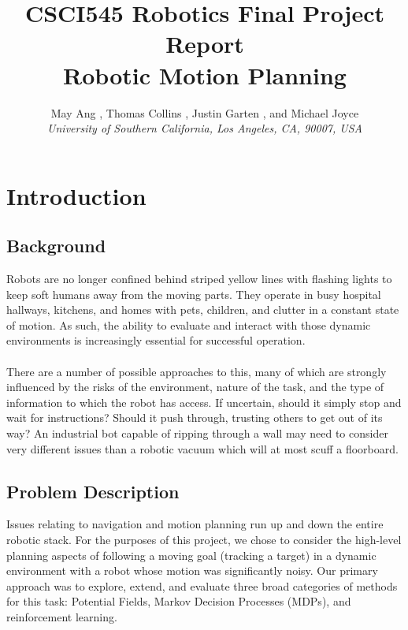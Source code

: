 \documentclass{aiaa-tc}%
\begin{document}
\title{CSCI545 Robotics Final Project Report\\
	Robotic Motion Planning}

 \author
{		May Ang%
		\hspace{3pt},
		Thomas Collins%
		\hspace{3pt},
		Justin Garten%
		\hspace{3pt},
		and Michael Joyce%
		\\
		\normalsize\itshape
		University of Southern California, Los Angeles, CA, 90007, USA\\
}
\maketitle

\section{Introduction}
\label{Introduction}

\subsection{Background}

Robots are no longer confined behind striped yellow lines
with flashing lights to keep soft humans away from the moving
parts. They operate in busy hospital hallways, kitchens, and homes
with pets, children, and clutter in a constant state of motion. As
such, the ability to evaluate and interact with those dynamic environments is
increasingly essential for successful operation. \\ \\
There are a number of possible approaches to this, many of which are
strongly influenced by the risks of the environment, nature of the
task, and the type of information to which the robot has
access. If uncertain, should it simply stop and wait for instructions?
Should it push through, trusting others to get out of its way? An
industrial bot capable of ripping through a wall may need to consider very different issues than a robotic vacuum which will at most scuff a
floorboard.
\subsection{Problem Description}

Issues relating to navigation and motion planning run up and down the entire
robotic stack. For the purposes of this project, we chose to consider the high-level planning 
aspects of following a moving goal (tracking a target) in a dynamic environment with a robot whose motion was significantly noisy.
Our primary approach was to explore, extend, and
evaluate three broad categories of methods for this task: Potential Fields, Markov Decision Processes (MDPs), and
reinforcement learning.
\end{document}
